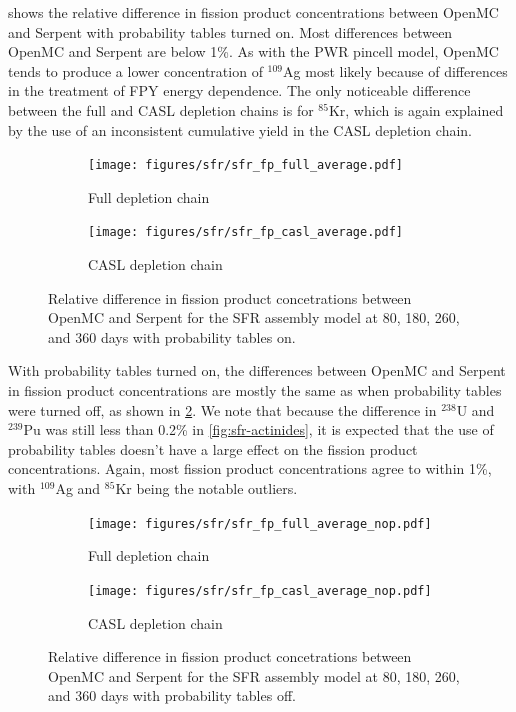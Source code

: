 \documentclass[3p,authoryear]{elsarticle}
\begin{document}
 shows the relative difference in fission product
concentrations between OpenMC and Serpent with probability tables turned on.
Most differences between OpenMC and Serpent are below 1\%. As with the PWR
pincell model, OpenMC tends to produce a lower concentration of $^{109}$Ag most
likely because of differences in the treatment of FPY energy dependence. The
only noticeable difference between the full and CASL depletion chains is for
$^{85}$Kr, which is again explained by the use of an inconsistent cumulative
yield in the CASL depletion chain.
\begin{figure}[H]
  \centering
  \begin{subfigure}[t]{0.45\textwidth}
    \texttt{[image: figures/sfr/sfr\_fp\_full\_average.pdf]}
    \caption{Full depletion chain}
  \end{subfigure}
  \hspace{0.05\textwidth}
  \begin{subfigure}[t]{0.45\textwidth}
    \texttt{[image: figures/sfr/sfr\_fp\_casl\_average.pdf]}
    \caption{CASL depletion chain}
  \end{subfigure}
  \caption{Relative difference in fission product concetrations between OpenMC
  and Serpent for the SFR assembly model at 80, 180, 260, and 360 days with
  probability tables on.}
  \label{fig:sfr-fp}
\end{figure}

With probability tables turned on, the differences between OpenMC and Serpent in
fission product concentrations are mostly the same as when probability tables
were turned off, as shown in \cref{fig:sfr-fp-nop}. We note that because the
difference in $^{238}$U and $^{239}$Pu was still less than 0.2\% in
\cref{fig:sfr-actinides}, it is expected that the use of probability tables
doesn't have a large effect on the fission product concentrations. Again, most
fission product concentrations agree to within 1\%, with $^{109}$Ag and
$^{85}$Kr being the notable outliers.
\begin{figure}[H]
  \centering
  \begin{subfigure}[t]{0.45\textwidth}
    \texttt{[image: figures/sfr/sfr\_fp\_full\_average\_nop.pdf]}
    \caption{Full depletion chain}
  \end{subfigure}
  \hspace{0.05\textwidth}
  \begin{subfigure}[t]{0.45\textwidth}
    \texttt{[image: figures/sfr/sfr\_fp\_casl\_average\_nop.pdf]}
    \caption{CASL depletion chain}
  \end{subfigure}
  \caption{Relative difference in fission product concetrations between OpenMC
  and Serpent for the SFR assembly model at 80, 180, 260, and 360 days with
  probability tables off.}
  \label{fig:sfr-fp-nop}
\end{figure}
\end{document}
